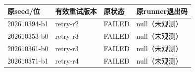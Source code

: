 \begin{tabular}{llll}
\toprule
原seed/位 & 有效重试版本 & 原状态 & 原runner退出码\\
\midrule
202610394-b1 & retry-r2 & FAILED & null（未观测）\\
202610353-b0 & retry-r3 & FAILED & null（未观测）\\
202610361-b0 & retry-r3 & FAILED & null（未观测）\\
202610371-b1 & retry-r4 & FAILED & null（未观测）\\
\bottomrule
\end{tabular}
